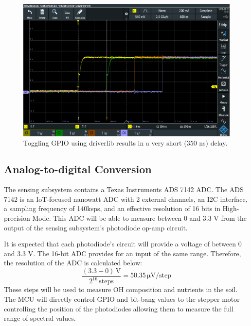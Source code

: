 \begin{figure}
    \centering
    \label{fig:gpio_toggle_driverlib}
    \includegraphics[width=\linewidth]{images/gpio_toggle_driverlib.jpg}
    \caption{Toggling GPIO using driverlib results in a very short (350 ns) delay.}
\end{figure}

\subsection{Analog-to-digital Conversion}
The sensing subsystem contains a Texas Instruments ADS 7142 ADC. The ADS 7142 is an IoT-focused nanowatt ADC with 2 external channels, an I2C interface, a sampling frequency of 140ksps, and an effective resolution of 16 bits in High-precision Mode. This ADC will be able to measure between 0 and 3.3 V from the output of the sensing subsystem's  photodiode op-amp circuit.

It is expected that each photodiode's circuit will provide a voltage of between 0 and 3.3 V. The 16-bit ADC provides for an input of the same range. Therefore, the resolution of the ADC is calculated below:
\begin{equation}
    \frac{(3.3 - 0)\,\mathrm{V}}{2^{16}\,\mathrm{steps}} =
    50.35\,\mathrm{\mu V}/\mathrm{step}
\end{equation}
These steps will be used to measure OH composition and nutrients in the soil. The MCU will directly control GPIO and bit-bang values to the stepper motor controlling the position of the photodiodes allowing them to measure the full range of spectral values.

